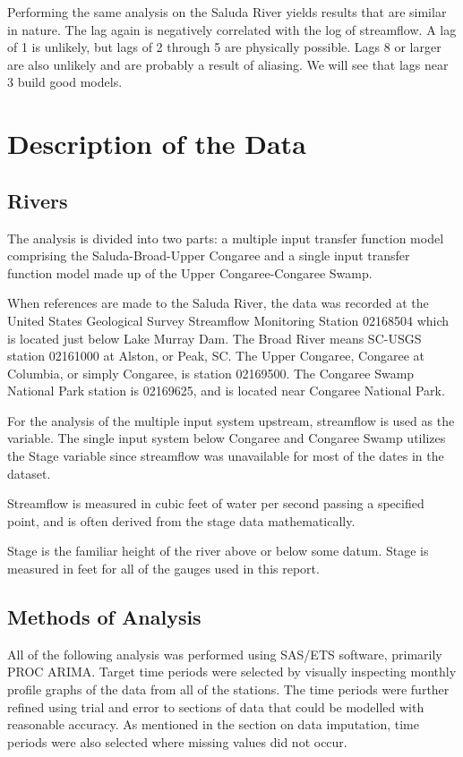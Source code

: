 \documentclass[12pt]{report}
\begin{document}
Performing the same analysis on the Saluda River yields results
that are similar in nature. The lag again is negatively correlated
with the log of streamflow.  A lag of 1 is unlikely, but lags of 2
through 5 are physically possible.  Lags 8 or larger are also
unlikely and are probably a result of aliasing.  We will see that
lags near 3 build good models.

\section{Description of the Data}
\subsection{Rivers}
The analysis is divided into two parts: a multiple input transfer
function model comprising the Saluda-Broad-Upper Congaree and a
single input transfer function model made up of the Upper
Congaree-Congaree Swamp.

When references are made to the Saluda River, the data was
recorded at the United States Geological Survey Streamflow
Monitoring Station 02168504 which is located just below Lake
Murray Dam.  The Broad River means SC-USGS station 02161000 at
Alston, or Peak, SC. The Upper Congaree, Congaree at Columbia, or
simply Congaree, is station 02169500.  The Congaree Swamp National
Park station is 02169625, and is located near Congaree National
Park.

For the analysis of the multiple input system upstream, streamflow
is used as the variable.  The single input system below Congaree
and Congaree Swamp utilizes the Stage variable since streamflow
was unavailable for most of the dates in the dataset.

Streamflow is measured in cubic feet of water per second passing a
specified point, and is often derived from the stage data
mathematically.

Stage is the familiar height of the river above or below some
datum.  Stage is measured in feet for all of the gauges used in
this report.

\subsection{Methods of Analysis}
All of the following analysis was performed using SAS/ETS
software, primarily PROC ARIMA.  Target time periods were selected
by visually inspecting monthly profile graphs of the data from all
of the stations.  The time periods were further refined using
trial and error to sections of data that could be modelled with
reasonable accuracy.  As mentioned in the section on data
imputation, time periods were also selected where missing values
did not occur.
\end{document}
